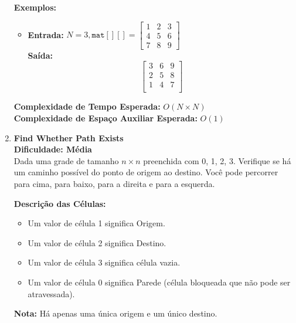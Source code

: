\documentclass[a4paper,12pt]{article}
\begin{document}
\begin{enumerate}
\textbf{Exemplos:}
\begin{itemize}
    \item \textbf{Entrada:} \( N = 3, \texttt{mat}[][] = \begin{bmatrix}1 & 2 & 3\\4 & 5 & 6\\7 & 8 & 9\end{bmatrix} \) \\
    \textbf{Saída:} 
    \[
    \begin{bmatrix}
       3 & 6 & 9 \\
       2 & 5 & 8 \\
       1 & 4 & 7 \\
    \end{bmatrix}
    \]
\end{itemize}

\textbf{Complexidade de Tempo Esperada:} \( O(N \times N) \) \\
\textbf{Complexidade de Espaço Auxiliar Esperada:} \( O(1) \)

\item \textbf{Find Whether Path Exists} \\
\textbf{Dificuldade: Média} \\
Dada uma grade de tamanho \( n \times n \) preenchida com 0, 1, 2, 3. Verifique se há um caminho possível do ponto de origem ao destino. Você pode percorrer para cima, para baixo, para a direita e para a esquerda. 

\textbf{Descrição das Células:}
\begin{itemize}
    \item Um valor de célula 1 significa Origem.
    \item Um valor de célula 2 significa Destino.
    \item Um valor de célula 3 significa célula vazia.
    \item Um valor de célula 0 significa Parede (célula bloqueada que não pode ser atravessada).
\end{itemize}

\textbf{Nota:} Há apenas uma única origem e um único destino.


\end{enumerate}
\end{document}
